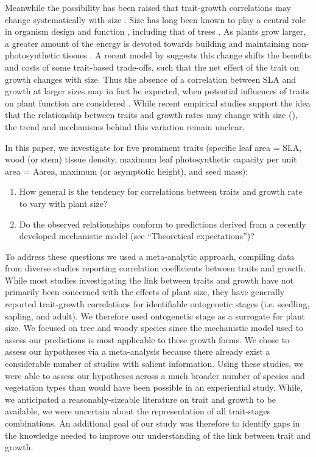 \documentclass[a4paper,11pt]{article}
\begin{document}
Meanwhile the possibility has been raised that trait-growth correlations may change systematically with size \citep{King-1999, Falster:2011ii, Ruger:2012jv, Iida:2014ep, Iida:2014hq}. Size has long been known to play a central role in organism design and function \citep{Vogel:1988ux, Vogel:2003wb}, including that of trees \citep{Farnsworth:1995im, Givnish:1995ta, King-2011}. As plants grow larger, a greater amount of the energy is devoted towards building and maintaining non-photosynthetic tissues \citep{Givnish:1995ta,King-2011}. A recent model by \citet{Falster:2011ii} suggests this change shifts the benefits and costs of some trait-based trade-offs, such that the net effect of the trait on growth changes with size. Thus the absence of a correlation between SLA and growth at larger sizes may in fact be expected, when potential influences of traits on plant function are considered \citep{Falster:2011ii}. While recent empirical studies support the idea that the relationship between traits and growth rates may change with size (\citealt{Iida:2014ep, Iida:2014hq}), the trend and mechanisms behind this variation remain unclear.

In this paper, we investigate for five prominent traits (specific leaf area = SLA, wood (or stem) tissue density, maximum leaf photosynthetic capacity per unit area = Aarea, maximum (or asymptotic height), and seed mass):
\begin{enumerate}
  \item How general is the tendency for correlations between traits and growth rate to vary with plant size?
  \item Do the observed relationships conform to predictions derived from a recently developed mechanistic model \citep{Falster:2011ii} (see ``Theoretical expectations'')?
\end{enumerate}
To address these questions we used a meta-analytic approach, compiling data from diverse studies reporting correlation coefficients between traits and growth. While most studies investigating the link between traits and growth have not primarily been concerned with the effects of plant size, they have generally reported trait-growth correlations for identifiable ontogenetic stages (i.e. seedling, sapling, and adult). We therefore used ontogenetic stage as a surrogate for plant size. We focused on tree and woody species since the mechanistic model used to assess our predictions is most applicable to these growth forms.
We chose to assess our hypotheses via a meta-analysis because there already exist a considerable number of studies with salient information. Using these studies, we were able to assess our hypotheses across a much broader number of species and vegetation types than would have been possible in an experiential study. While, we anticipated a reasonably-sizeable literature on trait and growth to be available, we were uncertain about the representation of all trait-stages combinations. An additional goal of our study was therefore to identify gaps in the knowledge needed to improve our understanding of the link between trait and growth.
\end{document}
